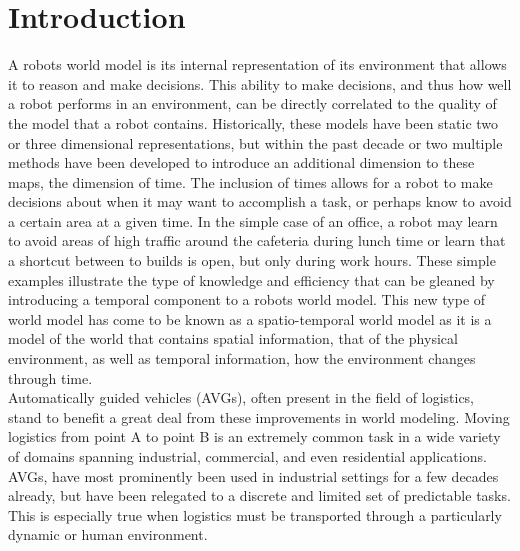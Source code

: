 

  \chapter{ Introduction }

  A robots world model is its internal representation of its environment that
  allows it to reason and make decisions. This ability to make decisions, and
  thus how well a robot performs in an environment, can be directly correlated
  to the quality of the model that a robot contains. Historically, these models
  have been static two or three dimensional representations, but within the past
  decade or two multiple methods have been developed to introduce an additional
  dimension to these maps, the dimension of time. The inclusion of times allows
  for a robot to make decisions about when it may want to accomplish a task, or
  perhaps know to avoid a certain area at a given time. In the simple case of an
  office, a robot may learn to avoid areas of high traffic around the cafeteria
  during lunch time or learn that a shortcut between to builds is open, but only
  during work hours. These simple examples illustrate the type of knowledge and
  efficiency that can be gleaned by introducing a temporal component to a robots
  world model. This new type of world model has come to be known as a
  spatio-temporal world model as it is a model of the world that contains
  spatial information, that of the physical environment, as well as temporal
  information, how the environment changes through time.\\

  Automatically guided vehicles (AVGs), often present in the field of logistics,
  stand to benefit a great deal from these improvements in world modeling.
  Moving logistics from point A to point B is an extremely common task in a wide
  variety of domains spanning industrial, commercial, and even residential
  applications. AVGs, have most prominently been used in industrial settings for
  a few decades already, but have been relegated to a discrete and limited set
  of predictable tasks. This is especially true when logistics must be
  transported through a particularly dynamic or human environment.\\

